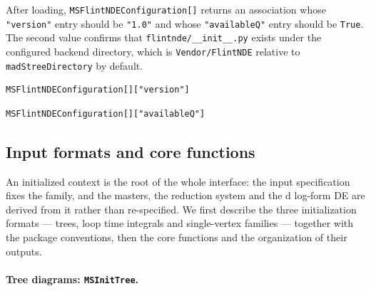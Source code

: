 \documentclass[11pt,a4paper]{article}
\numberwithin{table}{section}
\begin{document}
After loading, \texttt{MSFlintNDEConfiguration[]} returns an association whose \texttt{"version"}
entry should be \texttt{"1.0"} and whose \texttt{"availableQ"} entry should be \texttt{True}. The
second value confirms that \texttt{flintnde/\_\_init\_\_.py} exists under the configured backend
directory, which is \texttt{Vendor/FlintNDE} relative to \texttt{madStreeDirectory} by default.
\begin{verbatim}
MSFlintNDEConfiguration[]["version"]
\end{verbatim}
\begin{verbatim}
MSFlintNDEConfiguration[]["availableQ"]
\end{verbatim}

\subsection{Input formats and core functions}
\label{sec:inputs}

An initialized context is the root of the whole interface: the input specification fixes the
family, and the masters, the reduction system and the d log-form DE are derived from it rather
than re-specified. We first describe the three initialization formats --- trees, loop time
integrals and single-vertex families --- together with the package conventions, then the core
functions and the organization of their outputs.

\paragraph{Tree diagrams: \texttt{MSInitTree}.}
\end{document}
